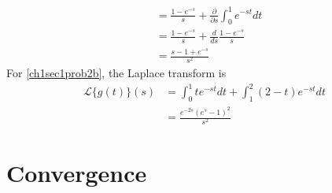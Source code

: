 \begin{exercise}
\begin{align*}
                           & = \frac{1 - e^{-s}}{s} +
                             \frac{\partial }{\partial s}\int_0^1e^{-st}dt\\
                           & = \frac{1 - e^{-s}}{s} + \frac{d}{ds}
                             \frac{1 - e^{-s}}{s}\\
                           & = \frac{s - 1 + e^{-s}}{s^2}
  \end{align*}
  For \cref{ch1sec1prob2b}, the Laplace transform is
  \begin{align*}
    \mathcal{L}\{g(t)\}(s) & = \int_0^1te^{-st}dt + \int_1^2(2 - t)e^{-st}dt\\
                           & = \frac{e^{-2s}(e^s - 1)^2}{s^2}
  \end{align*}
\end{exercise}

\section{Convergence}

